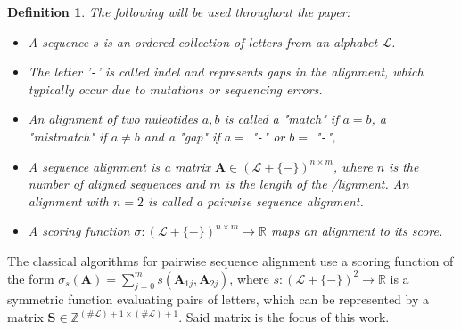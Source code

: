 \documentclass{article}
\newtheorem{definition}{Definition}
\begin{document}
\begin{definition}
    The following will be used throughout the paper:
    \begin{itemize}
        \item A \emph{sequence} $s$ is an ordered collection of letters from
              an alphabet $\mathcal{L}$.
        \item The letter '\texttt{-}' is called \emph{indel} and represents
              gaps in the alignment, which typically occur due to mutations or sequencing
              errors.
      \item An alignment of two nuleotides $a, b$ is called a "\emph{match}" if $a = b$, a "\emph{mistmatch"} if $a \ne b$ and a "\emph {gap}" if $a =$ "\texttt{-}" or $b =$ "\texttt{-}",

        \item A \emph{sequence alignment} is a matrix $\mathbf A \in
                  (\mathcal{L} + \{\mathtt{-}\})^{n \times m}$, where $n$ is the number of aligned sequences and $m$ is the
              length of the /lignment.
	      An alignment with $n = 2$ is called a \emph{pairwise sequence alignment.}
      \item A \emph{scoring function} $\sigma: (\mathcal{L} + \{\mathtt{-}\})^{n
                      \times m} \to \mathbb{R}$ maps an alignment to its score.
    \end{itemize}
\end{definition}


The classical algorithms for pairwise sequence alignment use a scoring function of the form
$\sigma_s( \mathbf A )= \sum_{j=0}^m s(\mathbf A_{1j}, \mathbf A_{2j})$, where $s:
    (\mathcal L + \{\mathtt{-}\})^2 \to \mathbb{R}$ is a symmetric function
evaluating pairs of letters, which can be represented by a matrix $\mathbf S
    \in \mathbb Z^{(\# \mathcal L) + 1 \times (\# \mathcal L) + 1}$. Said matrix is
the focus of this work.
\end{document}

